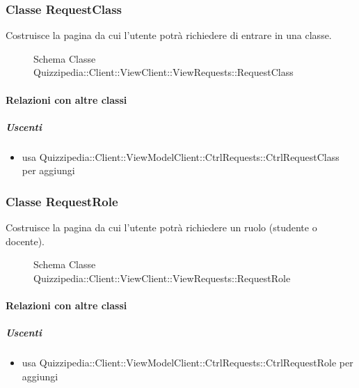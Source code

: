 \subsubsection{Classe RequestClass}
Costruisce la pagina da cui l'utente potrà richiedere di entrare in una classe.
\begin{figure}[H]
\centering
\noindent{}
\caption[Schema Classe RequestClass]{Schema Classe Quizzipedia::Client::ViewClient::ViewRequests::RequestClass}
\end{figure}
\paragraph{Relazioni con altre classi}
\subparagraph{Uscenti}
\begin{itemize}
\item usa Quizzipedia::Client::ViewModelClient::CtrlRequests::CtrlRequestClass per aggiungi
\end{itemize}
\subsubsection{Classe RequestRole}
Costruisce la pagina da cui l'utente potrà richiedere un ruolo (studente o docente).
\begin{figure}[H]
\centering
\noindent{}
\caption[Schema Classe RequestRole]{Schema Classe Quizzipedia::Client::ViewClient::ViewRequests::RequestRole}
\end{figure}
\paragraph{Relazioni con altre classi}
\subparagraph{Uscenti}
\begin{itemize}
\item usa Quizzipedia::Client::ViewModelClient::CtrlRequests::CtrlRequestRole per aggiungi
\end{itemize}
